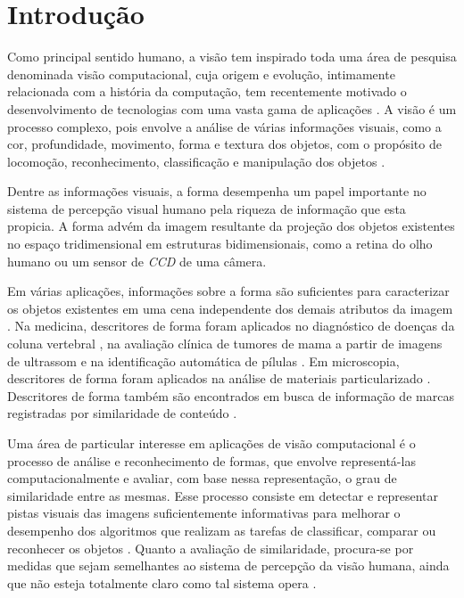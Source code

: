 
\chapter{Introdução \label{chap:INTRO}}


Como principal sentido humano, a visão tem inspirado toda uma área de pesquisa denominada visão computacional, cuja origem e evolução, intimamente relacionada com a história da computação, tem recentemente motivado o desenvolvimento de tecnologias com uma vasta gama de aplicações \cite{Costa:2009}. A visão é um processo complexo, pois envolve a análise de várias informações visuais, como a cor, profundidade, movimento, forma e textura dos objetos, com o propósito de locomoção, reconhecimento, classificação e manipulação dos objetos \cite{Ullman:1996}.

Dentre as informações visuais, a forma desempenha um papel importante no sistema de percepção visual humano pela riqueza de informação que esta propicia. A forma advém da imagem resultante da projeção dos objetos existentes no espaço tridimensional em estruturas bidimensionais, como a retina do olho humano ou um sensor de \emph{CCD} de uma câmera.

Em várias aplicações, informações sobre a forma são suficientes para caracterizar os objetos existentes em uma cena independente dos demais atributos da imagem \cite{Zhang201661,deSouza2016,Zhao20153203}. Na medicina, descritores de forma foram aplicados no diagnóstico de doenças da coluna vertebral \cite{Lee:2009}, na avaliação clínica de tumores de mama a partir de imagens de ultrassom \cite{Yang:2009} e na identificação automática de pílulas \cite{Ushizima:2015}. Em microscopia, descritores de forma foram aplicados na análise de materiais particularizado \cite{Zhang201661}. Descritores de forma também são encontrados em busca de informação de marcas registradas por similaridade de conteúdo \cite{MohdAnuar2013105,Qi20102017}.

Uma área de particular interesse em aplicações de visão computacional é o processo de análise e reconhecimento de formas, que envolve representá-las computacionalmente e avaliar, com base nessa representação, o grau de similaridade entre as mesmas. Esse processo consiste em detectar e representar pistas visuais das imagens suficientemente informativas para melhorar o desempenho dos algoritmos que realizam as tarefas de classificar, comparar ou reconhecer os objetos \cite{Escolano:2009}. Quanto a avaliação de similaridade, procura-se por medidas que sejam semelhantes ao sistema de percepção da visão humana, ainda que não esteja totalmente claro como tal sistema opera \cite{4815272}. 

